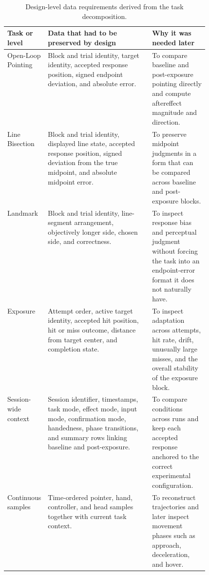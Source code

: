 \begin{table}[H]
    \centering
    \footnotesize
    \setlength{\tabcolsep}{5pt}
    \renewcommand{\arraystretch}{1.18}
    \begin{tabularx}{\linewidth}{|
        >{\raggedright\arraybackslash}p{0.19\linewidth}|
        >{\raggedright\arraybackslash}X|
        >{\raggedright\arraybackslash}p{0.29\linewidth}|}
        \hline
        \textbf{Task or level} & \textbf{Data that had to be preserved by design} & \textbf{Why it was needed later} \\
        \hline
        Open-Loop Pointing & Block and trial identity, target identity, accepted response position, signed endpoint deviation, and absolute error. & To compare baseline and post-exposure pointing directly and compute aftereffect magnitude and direction. \\
        \hline
        Line Bisection & Block and trial identity, displayed line state, accepted response position, signed deviation from the true midpoint, and absolute midpoint error. & To preserve midpoint judgments in a form that can be compared across baseline and post-exposure blocks. \\
        \hline
        Landmark & Block and trial identity, line-segment arrangement, objectively longer side, chosen side, and correctness. & To inspect response bias and perceptual judgment without forcing the task into an endpoint-error format it does not naturally have. \\
        \hline
        Exposure & Attempt order, active target identity, accepted hit position, hit or miss outcome, distance from target center, and completion state. & To inspect adaptation across attempts, hit rate, drift, unusually large misses, and the overall stability of the exposure block. \\
        \hline
        Session-wide context & Session identifier, timestamps, task mode, effect mode, input mode, confirmation mode, handedness, phase transitions, and summary rows linking baseline and post-exposure. & To compare conditions across runs and keep each accepted response anchored to the correct experimental configuration. \\
        \hline
        Continuous samples & Time-ordered pointer, hand, controller, and head samples together with current task context. & To reconstruct trajectories and later inspect movement phases such as approach, deceleration, and hover. \\
        \hline
    \end{tabularx}
    \caption{Design-level data requirements derived from the task decomposition.}
    \label{tab:design-data-requirements}
\end{table}

